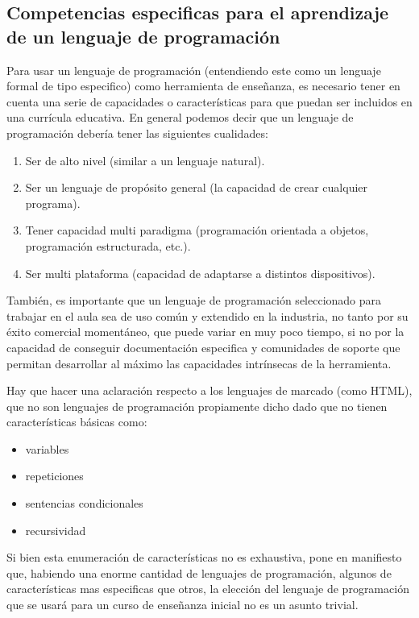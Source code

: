 \subsection{Competencias especificas para el aprendizaje de un lenguaje de programación}

Para usar un lenguaje de programación (entendiendo este como un lenguaje formal de tipo especifico) como herramienta de enseñanza, es necesario tener en cuenta una serie de capacidades o características para que puedan ser incluidos en una currícula educativa. En general podemos decir que un lenguaje de programación debería tener las siguientes cualidades:

\begin{enumerate}
   \item Ser de alto nivel (similar a un lenguaje natural).
   \item Ser un lenguaje de propósito general (la capacidad de crear cualquier programa).
   \item Tener capacidad multi paradigma (programación orientada a objetos, programación estructurada, etc.).
   \item Ser multi plataforma (capacidad de adaptarse a distintos dispositivos).
 \end{enumerate} 
 
También, es importante que un lenguaje de programación seleccionado para trabajar en el aula sea de uso común y extendido en la industria, no tanto por su éxito comercial momentáneo, que puede variar en muy poco tiempo, si no por la capacidad de conseguir documentación especifica y comunidades de soporte que permitan desarrollar al máximo las capacidades intrínsecas de la herramienta.

Hay que hacer una aclaración respecto a los lenguajes de marcado (como HTML), que no son lenguajes de programación propiamente dicho dado que no tienen características básicas como:

\begin{itemize}
   \item variables
   \item repeticiones
   \item sentencias condicionales
   \item recursividad
 \end{itemize} 

Si bien esta enumeración de características no es exhaustiva, pone en manifiesto que, habiendo una enorme cantidad de lenguajes de programación, algunos de características mas especificas que otros, la elección del lenguaje de programación que se usará para un curso de enseñanza inicial no es un asunto trivial.


